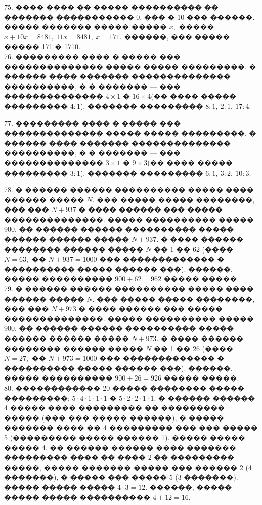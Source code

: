 \documentclass[12pt]{article}
\begin{document}
\begin{center}
\begin{figure}[ht!]
\end{figure}
\end{center}
75. ���� ���� �� ����� ���������� �� ������� ����������� 0, ��� � 10 ��� ������. ����� ������� ����� ����� $x,$ ����� $x+10x=8481,\ 11x=8481,\ x=171.$ ������, ��� ����� ����� 171 � 1710.\\
76. ��������� ���� � ����� ��� �������������� ����� ����� ���������. � ������ ���� ������� �������������� ����������, � � ������� --- ��� �������������� $4\times1$ � $16\times4$(�� ���� ����� ��������� $4:1$). ������� ��������� $8:1,\ 2:1,\ 17:4.$
\begin{center}
\begin{figure}[ht!]
\end{figure}
\end{center}
77. ��������� ���� � ����� ��� �������������� ����� ����� ���������. � ������ ���� ������� �������������� ����������, � � ������� --- ��� �������������� $3\times1$ � $9\times3$(�� ���� ����� ��������� $3:1$). ������� ��������� $6:1,\ 3:2,\ 10:3.$
\begin{center}
\begin{figure}[ht!]
\end{figure}
\end{center}
78. � ������ ������ ���������� ����� ���� ������ ����� $N.$ ��� ����� ����� ��������, ��� ��� $N+937$ � ���� ������ ��� ����� ��������������. ����� ���������� ����� 900. �� ������ ������ ���������� ����� ������ ������ ����� $N+937.$ � ���� ������ �������� ������ ����� $N$ �� 1 �� 62 (���� $N=63,$ �� $N+937=1000$ ��� ������������� � ���������� ����� ������ ���). ������, ����� ���������� $900+62=962$ ����� �����.\\
79. � ������ ������ ���������� ����� ���� ������ ����� $N.$ ��� ����� ����� ��������, ��� ��� $N+973$ � ���� ������ ��� ����� ��������������. ����� ���������� ����� 900. �� ������ ������ ���������� ����� ������ ������ ����� $N+973.$ � ���� ������ �������� ������ ����� $N$ �� 1 �� 26 (���� $N=27,$ �� $N+973=1000$ ��� ������������� � ���������� ����� ������ ���). ������, ����� ���������� $900+26=926$ ����� �����.\\
80. ������������ 20 ����� �������� ����� ���������: $5\cdot4\cdot1\cdot1\cdot1$ � $5\cdot2\cdot2\cdot1\cdot1.$ � ������ ������ 4 ����� ���� ��������� �� ��������� ����� (��� ��� ����� ������), � ����� ������� ���� �� 4 ��������� ��� ��� ����� 5 (��������� ����� ������ 1). ����� ����� ����� 4. �� ������ ������ ���� ������� ��������� ���� �� ���� 2 �� ��������� �����, ����� ������� ����� ��� ������ 2 (4 �������), � ����� ��� ����� 5 (3 �������). ����� ����� ����� $4\cdot3=12.$ ������, ����� ����� ����� ���������� $4+12=16.$\\
\end{document}
